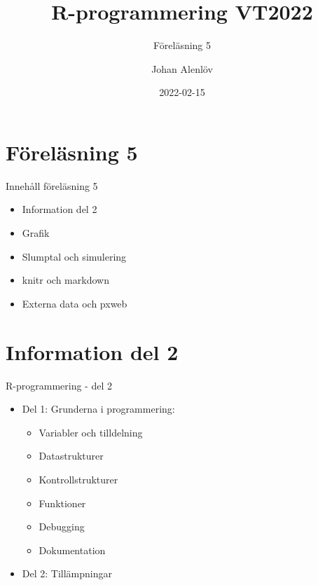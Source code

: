 \documentclass[
  11pt,
  ignorenonframetext,
  handout]{beamer}
\title{R-programmering VT2022}
\subtitle{Föreläsning 5}
\author{Johan Alenlöv}
\date{2022-02-15}
\institute{Linköpings Universitet}
\providecommand{\tightlist}{%
  \setlength{\itemsep}{0pt}\setlength{\parskip}{0pt}}
\begin{document}
\frame{\titlepage}

\hypertarget{fuxf6reluxe4sning-5}{%
\section{Föreläsning 5}\label{fuxf6reluxe4sning-5}}

\begin{frame}{Innehåll föreläsning 5}
\protect\hypertarget{innehuxe5ll-fuxf6reluxe4sning-5}{}
\begin{itemize}
\tightlist
\item
  Information del 2
\item
  Grafik
\item
  Slumptal och simulering
\item
  knitr och markdown
\item
  Externa data och pxweb
\end{itemize}
\end{frame}

\hypertarget{information-del-2}{%
\section{Information del 2}\label{information-del-2}}

\begin{frame}{R-programmering - del 2}
\protect\hypertarget{r-programmering---del-2}{}
\begin{itemize}
\tightlist
\item
  Del 1: Grunderna i programmering:

  \begin{itemize}
  \tightlist
  \item
    Variabler och tilldelning
  \item
    Datastrukturer
  \item
    Kontrollstrukturer
  \item
    Funktioner
  \item
    Debugging
  \item
    Dokumentation
  \end{itemize}
\item
  Del 2: Tillämpningar
\end{itemize}
\end{frame}
\end{document}
